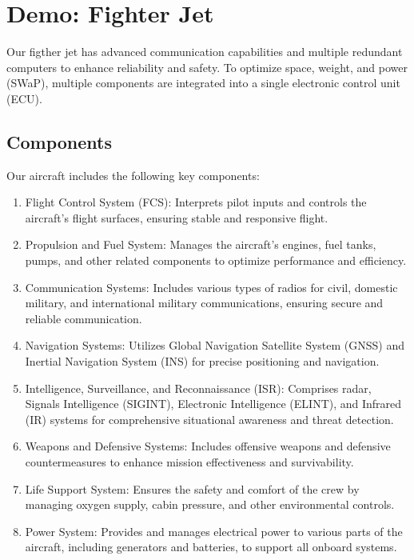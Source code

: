 \newpage
\section{Demo: Fighter Jet}
Our figther jet has advanced communication capabilities and multiple redundant computers to enhance reliability and safety. 
To optimize space, weight, and power (SWaP), multiple components are integrated into a single electronic control unit (ECU).

\subsection{Components}
Our aircraft includes the following key components:
\begin{enumerate}[label=P\arabic*)]
	\item Flight Control System (FCS): Interprets pilot inputs and controls the aircraft's flight surfaces, ensuring stable and responsive flight.
	\item Propulsion and Fuel System: Manages the aircraft's engines, fuel tanks, pumps, and other related components to optimize performance and efficiency.
	\item Communication Systems: Includes various types of radios for civil, domestic military, and international military communications, ensuring secure and reliable communication.
	\item Navigation Systems: Utilizes Global Navigation Satellite System (GNSS) and Inertial Navigation System (INS) for precise positioning and navigation.
	\item Intelligence, Surveillance, and Reconnaissance (ISR): Comprises radar, Signals Intelligence (SIGINT), Electronic Intelligence (ELINT), and Infrared (IR) systems for comprehensive situational awareness and threat detection.
	\item Weapons and Defensive Systems: Includes offensive weapons and defensive countermeasures to enhance mission effectiveness and survivability.
	\item Life Support System: Ensures the safety and comfort of the crew by managing oxygen supply, cabin pressure, and other environmental controls.
	\item Power System: Provides and manages electrical power to various parts of the aircraft, including generators and batteries, to support all onboard systems.
\end{enumerate}


